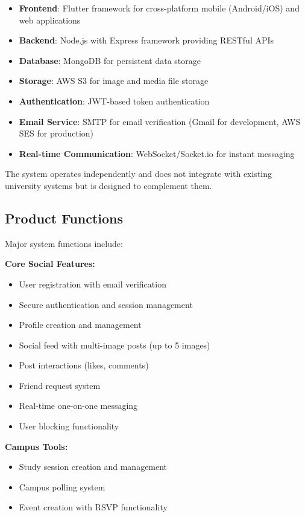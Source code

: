 \documentclass[12pt,a4paper]{article}
\begin{document}
\begin{itemize}
    \item \textbf{Frontend}: Flutter framework for cross-platform mobile (Android/iOS) and web applications
    \item \textbf{Backend}: Node.js with Express framework providing RESTful APIs
    \item \textbf{Database}: MongoDB for persistent data storage
    \item \textbf{Storage}: AWS S3 for image and media file storage
    \item \textbf{Authentication}: JWT-based token authentication
    \item \textbf{Email Service}: SMTP for email verification (Gmail for development, AWS SES for production)
    \item \textbf{Real-time Communication}: WebSocket/Socket.io for instant messaging
\end{itemize}

The system operates independently and does not integrate with existing university systems but is designed to complement them.

\subsection{Product Functions}
Major system functions include:

\textbf{Core Social Features:}
\begin{itemize}
    \item User registration with email verification
    \item Secure authentication and session management
    \item Profile creation and management
    \item Social feed with multi-image posts (up to 5 images)
    \item Post interactions (likes, comments)
    \item Friend request system
    \item Real-time one-on-one messaging
    \item User blocking functionality
\end{itemize}

\textbf{Campus Tools:}
\begin{itemize}
    \item Study session creation and management
    \item Campus polling system
    \item Event creation with RSVP functionality
\end{itemize}
\end{document}
